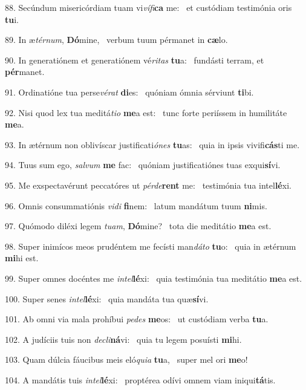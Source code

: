 88. Secúndum misericórdiam tuam vi\textit{ví}\textit{fi}\textbf{ca} me: \ast\  et custódiam testimónia oris \textbf{tu}i.\

89. In æ\textit{tér}\textit{num}, \textbf{Dó}mine, \ast\  verbum tuum pérmanet in \textbf{cæ}lo.\

90. In generatiónem et generatiónem vé\textit{ri}\textit{tas} \textbf{tu}a: \ast\  fundásti terram, et \textbf{pér}manet.\

91. Ordinatióne tua perse\textit{vé}\textit{rat} \textbf{di}es: \ast\  quóniam ómnia sérviunt \textbf{ti}bi.\

92. Nisi quod lex tua meditá\textit{ti}\textit{o} \textbf{me}a est: \ast\  tunc forte periíssem in humilitáte \textbf{me}a.\

93. In ætérnum non oblivíscar justificati\textit{ó}\textit{nes} \textbf{tu}as: \ast\  quia in ipsis vivifi\textbf{cás}ti me.\

94. Tuus sum ego, \textit{sal}\textit{vum} \textbf{me} fac: \ast\  quóniam justificatiónes tuas exqui\textbf{sí}vi.\

95. Me exspectavérunt peccatóres ut \textit{pér}\textit{de}\textbf{rent} me: \ast\  testimónia tua intel\textbf{lé}xi.\

96. Omnis consummatiónis \textit{vi}\textit{di} \textbf{fi}nem: \ast\  latum mandátum tuum \textbf{ni}mis.\

97. Quómodo diléxi legem \textit{tu}\textit{am}, \textbf{Dó}mine? \ast\  tota die meditátio \textbf{me}a est.\

98. Super inimícos meos prudéntem me fecísti man\textit{dá}\textit{to} \textbf{tu}o: \ast\  quia in ætérnum \textbf{mi}hi est.\

99. Super omnes docéntes me \textit{in}\textit{tel}\textbf{lé}xi: \ast\  quia testimónia tua meditátio \textbf{me}a est.\

100. Super senes \textit{in}\textit{tel}\textbf{lé}xi: \ast\  quia mandáta tua quæ\textbf{sí}vi.\

101. Ab omni via mala prohíbui \textit{pe}\textit{des} \textbf{me}os: \ast\  ut custódiam verba \textbf{tu}a.\

102. A judíciis tuis non \textit{de}\textit{cli}\textbf{ná}vi: \ast\  quia tu legem posuísti \textbf{mi}hi.\

103. Quam dúlcia fáucibus meis eló\textit{qui}\textit{a} \textbf{tu}a, \ast\  super mel ori \textbf{me}o!\

104. A mandátis tuis \textit{in}\textit{tel}\textbf{lé}xi: \ast\  proptérea odívi omnem viam iniqui\textbf{tá}tis.\

